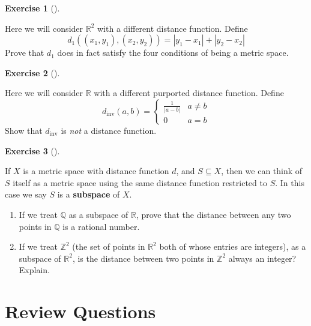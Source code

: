 \documentclass[
  letterpaper,
  DIV=11,
  numbers=noendperiod]{scrreprt}
\providecommand{\tightlist}{%
  \setlength{\itemsep}{0pt}\setlength{\parskip}{0pt}}
\def\R{\mathbb R}
\def\Q{\mathbb Q}
\def\Z{\mathbb Z}
\theoremstyle{plain}
\theoremstyle{definition}
\newtheorem{exercise}{Exercise}[chapter]
\theoremstyle{plain}
\theoremstyle{plain}
\theoremstyle{definition}
\theoremstyle{definition}
\theoremstyle{remark}
\begin{document}
\begin{exercise}[]\protect\hypertarget{exr-taxicab}{}\label{exr-taxicab}

Here we will consider \(\R^2\) with a different distance function.
Define \[d_1((x_1,y_1),(x_2,y_2))=|y_1-x_1|+|y_2-x_2|\] Prove that
\(d_1\) does in fact satisfy the four conditions of being a metric
space.

\end{exercise}

\begin{exercise}[]\protect\hypertarget{exr-fake-metric-space}{}\label{exr-fake-metric-space}

Here we will consider \(\R\) with a different purported distance
function. Define
\[d_{\mathrm{inv}}(a,b)=\begin{cases} \frac{1}{|a-b|} & a\neq b \\ 0 & a=b \end{cases}\]
Show that \(d_{\mathrm{inv}}\) is \emph{not} a distance function.

\end{exercise}

\begin{exercise}[]\protect\hypertarget{exr-subspaces}{}\label{exr-subspaces}

If \(X\) is a metric space with distance function \(d\), and
\(S\subseteq X\), then we can think of \(S\) itself as a metric space
using the same distance function restricted to \(S\). In this case we
say \(S\) is a \textbf{subspace} of \(X\).

\begin{enumerate}
\def\labelenumi{\arabic{enumi}.}
\tightlist
\item
  If we treat \(\Q\) as a subspace of \(\R\), prove that the distance
  between any two points in \(\Q\) is a rational number.
\item
  If we treat \(\Z^2\) (the set of points in \(\R^2\) both of whose
  entries are integers), as a subspace of \(\R^2\), is the distance
  between two points in \(\Z^2\) always an integer? Explain.
\end{enumerate}

\end{exercise}

\section*{Review Questions}\label{review-questions-3}
\end{document}

